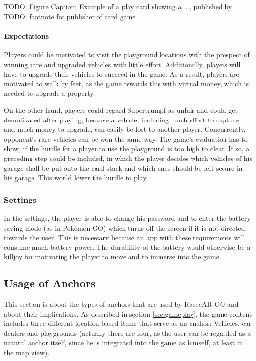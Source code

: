 TODO: Figure
Caption: Example of a play card showing a ..., published by TODO: footnote for publisher of card game

\paragraph{Expectations}
Players could be motivated to visit the playground locations with the prospect of winning rare and upgraded vehicles with little effort. Additionally, players will have to upgrade their vehicles to succeed in the game. As a result, players are motivated to walk by feet, as the game rewards this with virtual money, which is needed to upgrade a property.

On the other hand, players could regard Supertrumpf as unfair and could get demotivated after playing, because a vehicle, including much effort to capture and much money to upgrade, can easily be lost to another player. Concurrently, opponent's rare vehicles can be won the same way. The game's evaluation has to show, if the hurdle for a player to use the playground is too high to clear. If so, a preceding step could be included, in which the player decides which vehicles of his garage shall be put onto the card stack and which ones should be left secure in his garage. This would lower the hurdle to play.

\subsubsection{Settings}
In the settings, the player is able to change his password and to enter the battery saving mode (as in Pokémon GO) which turns off the screen if it is not directed towards the user. This is necessary because an app with these requirements will consume much battery power. The durability of the battery would otherwise be a killjoy for motivating the player to move and to immerse into the game.

\subsection{Usage of Anchors}\label{sec:usageOfAnchors}
This section is about the types of anchors that are used by RacecAR GO and about their implications. As described in section \ref{sec:gameplay}, the game content includes three different location-based items that serve as an anchor: Vehicles, car dealers and playgrounds (actually there are four, as the user can be regarded as a natural anchor itself, since he is integrated into the game as himself, at least in the map view).

